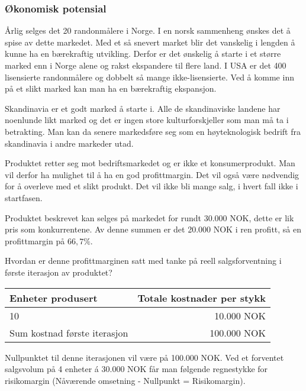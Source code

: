 \subsubsection{Økonomisk potensial}

Årlig selges det 20 randonmålere i Norge. I en norsk sammenheng ønskes det å spise av dette markedet. Med et så snevert market blir det vanskelig i lengden å kunne ha en bærekraftig utvikling. Derfor er det ønskelig å starte i et større marked enn i Norge alene og rakst ekspandere til flere land. I USA er det 400 lisensierte randonmålere og dobbelt så mange ikke-lisensierte. Ved å komme inn på et slikt marked kan man ha en bærekraftig ekspansjon.

Skandinavia er et godt marked å starte i. Alle de skandinaviske landene har noenlunde likt marked og det er ingen store kulturforskjeller som man må ta i betrakting. Man kan da senere markedsføre seg som en høyteknologisk bedrift fra skandinavia i andre markeder utad.

Produktet retter seg mot bedriftsmarkedet og er ikke et konsumerprodukt. Man vil derfor ha mulighet til å ha en god profittmargin. Det vil også være nødvendig for å overleve med et slikt produkt. Det vil ikke bli mange salg, i hvert fall ikke i startfasen.

Produktet beskrevet kan selges på markedet for rundt 30.000 NOK, dette er lik pris som konkurrentene. Av denne summen er det 20.000 NOK i ren profitt, så en profittmargin på $66,7 \%$.

Hvordan er denne profittmarginen satt med tanke på reell salgsforventning i første iterasjon av produktet?

\begin{table}[ht!]
    \begin{center}
    \begin{tabular}{ | l | r | }
        \hline
        Enheter produsert               & Totale kostnader per stykk \\
        \hline
        10                              & 10.000 NOK \\
        \hline
        Sum kostnad første iterasjon    & 100.000 NOK \\
        \hline
    \end{tabular}
    \end{center}
\end{table}

Nullpunktet til denne iterasjonen vil være på 100.000 NOK. Ved et forventet salgsvolum på 4 enheter á 30.000 NOK får man følgende regnestykke for risikomargin (Nåværende omsetning - Nullpunkt = Risikomargin).

